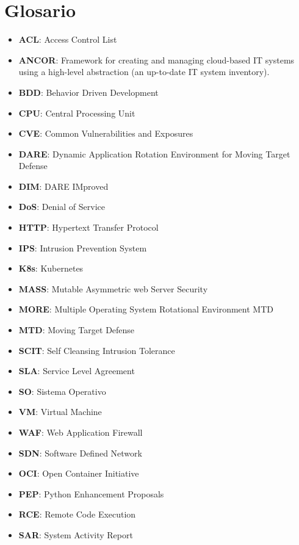 \chapter{Glosario}

\begin{itemize}
    \item \textbf{ACL}: Access Control List
    \item \textbf{ANCOR}: Framework for creating and managing cloud-based IT systems using a high-level abstraction (an up-to-date IT system inventory).
    \item \textbf{BDD}: Behavior Driven Development
    \item \textbf{CPU}: Central Processing Unit
    \item \textbf{CVE}: Common Vulnerabilities and Exposures
    \item \textbf{DARE}: Dynamic Application Rotation Environment for Moving Target Defense
    \item \textbf{DIM}: DARE IMproved
    \item \textbf{DoS}: Denial of Service
    \item \textbf{HTTP}: Hypertext Transfer Protocol
    \item \textbf{IPS}: Intrusion Prevention System
    \item \textbf{K8s}: Kubernetes
    \item \textbf{MASS}: Mutable Asymmetric web Server Security
    \item \textbf{MORE}: Multiple Operating System Rotational Environment MTD
    \item \textbf{MTD}: Moving Target Defense
    \item \textbf{SCIT}: Self Cleansing Intrusion Tolerance
    \item \textbf{SLA}: Service Level Agreement
    \item \textbf{SO}: Sistema Operativo
    \item \textbf{VM}: Virtual Machine
    \item \textbf{WAF}: Web Application Firewall
    \item \textbf{SDN}: Software Defined Network
    \item \textbf{OCI}: Open Container Initiative
    \item \textbf{PEP}: Python Enhancement Proposals
    \item \textbf{RCE}: Remote Code Execution
    \item \textbf{SAR}: System Activity Report
  \end{itemize}
  
